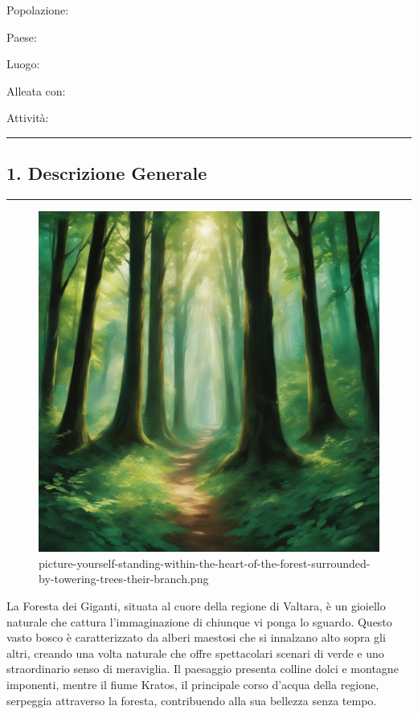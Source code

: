 Popolazione:

Paese:

Luogo:

Alleata con:

Attività:

\begin{center}\rule{0.5\linewidth}{0.5pt}\end{center}

\subsection{1. Descrizione Generale}\label{descrizione-generale}

\begin{center}\rule{0.5\linewidth}{0.5pt}\end{center}

\begin{figure}
\centering
\includegraphics{picture-yourself-standing-within-the-heart-of-the-forest-surrounded-by-towering-trees-their-branch.png}
\caption{picture-yourself-standing-within-the-heart-of-the-forest-surrounded-by-towering-trees-their-branch.png}
\end{figure}

La Foresta dei Giganti, situata al cuore della regione di Valtara, è un
gioiello naturale che cattura l'immaginazione di chiunque vi ponga lo
sguardo. Questo vasto bosco è caratterizzato da alberi maestosi che si
innalzano alto sopra gli altri, creando una volta naturale che offre
spettacolari scenari di verde e uno straordinario senso di meraviglia.
Il paesaggio presenta colline dolci e montagne imponenti, mentre il
fiume Kratos, il principale corso d'acqua della regione, serpeggia
attraverso la foresta, contribuendo alla sua bellezza senza tempo.

